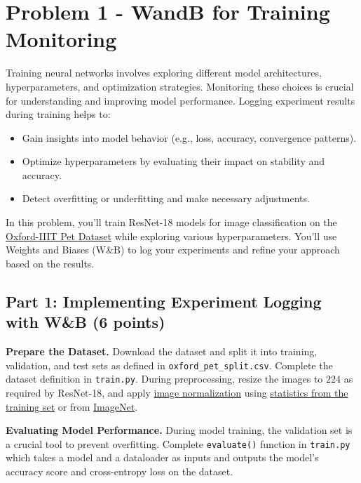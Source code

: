 \documentclass[11pt, oneside]{article}   	%
\begin{document}
\clearpage

\section*{Problem 1 - WandB for Training Monitoring}

Training neural networks involves exploring different model architectures, hyperparameters, and optimization strategies. Monitoring these choices is crucial for understanding and improving model performance. Logging experiment results during training helps to:
\begin{itemize}
    \item Gain insights into model behavior (e.g., loss, accuracy, convergence patterns).
    \item Optimize hyperparameters by evaluating their impact on stability and accuracy.
    \item Detect overfitting or underfitting and make necessary adjustments.
\end{itemize}

In this problem, you'll train ResNet-18 models for image classification on the \href{https://www.kaggle.com/datasets/tanlikesmath/the-oxfordiiit-pet-dataset?select=images}{Oxford-IIIT Pet Dataset} while exploring various hyperparameters. You’ll use Weights and Biases (W\&B) to log your experiments and refine your approach based on the results.

\subsection*{Part 1: Implementing Experiment Logging with W\&B (6 points)}

\noindent \textbf{Prepare the Dataset.} Download the dataset and split it into training, validation, and test sets as defined in \texttt{oxford\_pet\_split.csv}. Complete the dataset definition in \texttt{train.py}. During preprocessing, resize the images to $224$ as required by ResNet-18, and apply \href{https://discuss.pytorch.org/t/understanding-transform-normalize/21730}{image normalization} using \href{https://stackoverflow.com/questions/73350133/how-to-calculate-mean-and-standard-deviation-of-a-set-of-images}{statistics from the training set} or from \href{https://stackoverflow.com/questions/58151507/why-pytorch-officially-use-mean-0-485-0-456-0-406-and-std-0-229-0-224-0-2}{ImageNet}.

\noindent \textbf{Evaluating Model Performance.}
During model training, the validation set is a crucial tool to prevent overfitting. Complete \texttt{evaluate()} function in \texttt{train.py} which takes a model and a dataloader as inputs and outputs the model's accuracy score and cross-entropy loss on the dataset. 
\end{document}
